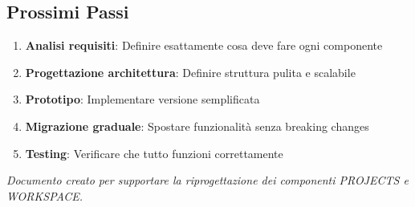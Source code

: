 \documentclass[11pt,a4paper]{article}
\begin{document}
\subsection{Prossimi Passi}

\begin{enumerate}
    \item \textbf{Analisi requisiti}: Definire esattamente cosa deve fare ogni componente
    \item \textbf{Progettazione architettura}: Definire struttura pulita e scalabile
    \item \textbf{Prototipo}: Implementare versione semplificata
    \item \textbf{Migrazione graduale}: Spostare funzionalità senza breaking changes
    \item \textbf{Testing}: Verificare che tutto funzioni correttamente
\end{enumerate}

\vspace{2cm}

\begin{center}
\textit{Documento creato per supportare la riprogettazione dei componenti PROJECTS e WORKSPACE.}
\end{center}
\end{document}
